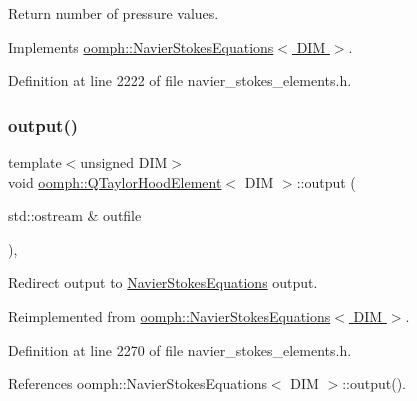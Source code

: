 Return number of pressure values. 



Implements \hyperlink{classoomph_1_1NavierStokesEquations_a4a17a76873bf3131d1e0acc74fb1c2d8}{oomph\+::\+Navier\+Stokes\+Equations$<$ D\+I\+M $>$}.



Definition at line 2222 of file navier\+\_\+stokes\+\_\+elements.\+h.

\mbox{\label{classoomph_1_1QTaylorHoodElement_a66200b671d6b16402d0d89c382af2f95}} 
\subsubsection{\texorpdfstring{output()}{output()}\hspace{0.1cm}{\footnotesize\ttfamily [1/4]}}
{\footnotesize\ttfamily template$<$unsigned D\+IM$>$ \\
void \hyperlink{classoomph_1_1QTaylorHoodElement}{oomph\+::\+Q\+Taylor\+Hood\+Element}$<$ D\+IM $>$\+::output (\begin{DoxyParamCaption}\item[{std\+::ostream \&}]{outfile }\end{DoxyParamCaption})\hspace{0.3cm}{\ttfamily [inline]}, {\ttfamily [virtual]}}



Redirect output to \hyperlink{classoomph_1_1NavierStokesEquations}{Navier\+Stokes\+Equations} output. 



Reimplemented from \hyperlink{classoomph_1_1NavierStokesEquations_ae2c8742419aae8961eb34dad989c69b9}{oomph\+::\+Navier\+Stokes\+Equations$<$ D\+I\+M $>$}.



Definition at line 2270 of file navier\+\_\+stokes\+\_\+elements.\+h.



References oomph\+::\+Navier\+Stokes\+Equations$<$ D\+I\+M $>$\+::output().

\mbox{\label{classoomph_1_1QTaylorHoodElement_a9a19616b9abaf15ad273f9eaa951de73}} 
